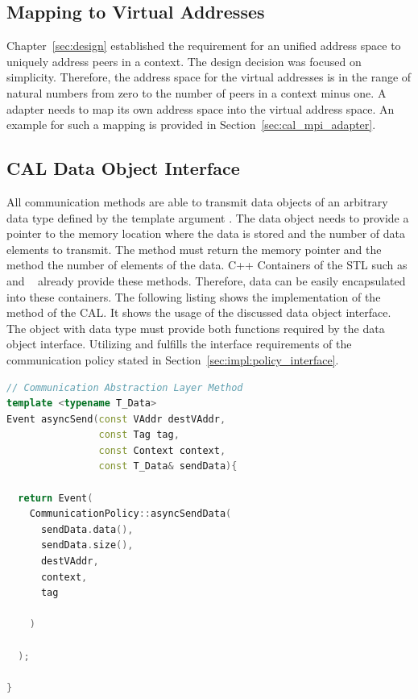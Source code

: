 \subsection{Mapping to Virtual Addresses}
\label{sec:impl:vaddr}
Chapter~\ref{sec:design} established the requirement for an unified address
space to uniquely address peers in a context. The design decision was
focused on simplicity. Therefore, the address space for the
virtual addresses is in the range of natural numbers from zero to the
number of peers in a context minus one. A adapter needs to map its
own address space into the virtual address space. An example for such a
mapping is provided in Section~\ref{sec:cal_mpi_adapter}.


\subsection{CAL Data Object Interface}
All communication methods are able to transmit data objects of an
arbitrary data type defined by the template argument . The
data object needs to provide a pointer to the memory location where
the data is stored and the number of data elements to transmit.  The
method  must return the memory pointer and the method
 the number of elements of the data. C++ Containers of the
STL such as  and ~\cite{ref:vector,
  ref:array} already provide these methods. Therefore, data can be
easily encapsulated into these containers. The following listing shows
the implementation of the  method of the CAL. It
shows the usage of the discussed data object interface.  The object
 with data type  must provide both functions
required by the data object interface. Utilizing 
and  fulfills the interface requirements of the
communication policy stated in
Section~\ref{sec:impl:policy_interface}.


\begin{minipage}[t]{\textwidth} 
  \begin{lstlisting}[language=C++, breaklines=false,  label={lst:cal_async_send}, caption={Data objects of the template data type \cpp{T\_Data} must provide the methods \cpp{data()} and \cpp{size()} which need to offer the memory pointer and the number of elements.}]
// Communication Abstraction Layer Method
template <typename T_Data>
Event asyncSend(const VAddr destVAddr, 
                const Tag tag, 
                const Context context, 
                const T_Data& sendData){

  return Event(
    CommunicationPolicy::asyncSendData(
      sendData.data(),
      sendData.size(), 
      destVAddr, 
      context, 
      tag
      
    )
      
  );

}
\end{lstlisting}
\end{minipage}


